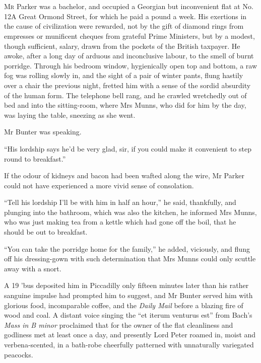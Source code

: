 \chapter[Chapter \thechapter]{}
\lettrine[lines=4]{M}{r} Parker was a bachelor, and occupied a Georgian but inconvenient flat at No. 12A Great Ormond Street, for which he paid a pound a week. His exertions in the cause of civilization were rewarded, not by the gift of diamond rings from empresses or munificent cheques from grateful Prime Ministers, but by a modest, though sufficient, salary, drawn from the pockets of the British taxpayer. He awoke, after a long day of arduous and inconclusive labour, to the smell of burnt porridge. Through his bedroom window, hygienically open top and bottom, a raw fog was rolling slowly in, and the sight of a pair of winter pants, flung hastily over a chair the previous night, fretted him with a sense of the sordid absurdity of the human form. The telephone bell rang, and he crawled wretchedly out of bed and into the sitting-room, where Mrs Munns, who did for him by the day, was laying the table, sneezing as she went.

Mr Bunter was speaking.

\enquote{His lordship says he’d be very glad, sir, if you could make it convenient to step round to breakfast.}

If the odour of kidneys and bacon had been wafted along the wire, Mr Parker could not have experienced a more vivid sense of consolation.

\enquote{Tell his lordship I’ll be with him in half an hour,} he said, thankfully, and plunging into the bathroom, which was also the kitchen, he informed Mrs Munns, who was just making tea from a kettle which had gone off the boil, that he should be out to breakfast.

\enquote{You can take the porridge home for the family,} he added, viciously, and flung off his dressing-gown with such determination that Mrs Munns could only scuttle away with a snort.

A 19 ’bus deposited him in Piccadilly only fifteen minutes later than his rather sanguine impulse had prompted him to suggest, and Mr Bunter served him with glorious food, incomparable coffee, and the \textit{Daily Mail} before a blazing fire of wood and coal. A distant voice singing the \enquote{et iterum venturus est} from Bach’s \textit{Mass in B minor} proclaimed that for the owner of the flat cleanliness and godliness met at least once a day, and presently Lord Peter roamed in, moist and verbena-scented, in a bath-robe cheerfully patterned with unnaturally variegated peacocks.


